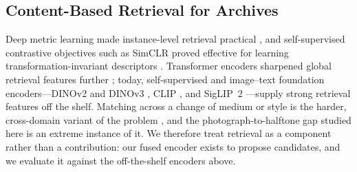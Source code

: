 \documentclass[letterpaper]{article} %
\begin{document}
\subsection{Content-Based Retrieval for Archives}
Deep metric learning made instance-level retrieval practical
\cite{schroff2015facenet}, and self-supervised contrastive objectives such as
SimCLR proved effective for learning transformation-invariant descriptors
\cite{chen2020simclr}. Transformer encoders sharpened global retrieval
features further \cite{dosovitskiy2021vit,elnouby2021training}; today,
self-supervised and image--text foundation encoders---DINOv2 and DINOv3
\cite{oquab2024dinov2,simeoni2025dinov3}, CLIP \cite{radford2021clip}, and
SigLIP~2 \cite{tschannen2025siglip2}---supply strong retrieval features off
the shelf. Matching across a change of medium or style is the harder,
cross-domain variant of the problem
\cite{shrivastava2011crossdomain,hu2023crossdomain}, and the
photograph-to-halftone gap studied here is an extreme instance of it. We
therefore treat retrieval as a component rather than a contribution: our fused
encoder exists to propose candidates, and we evaluate it against the
off-the-shelf encoders above.
\end{document}
